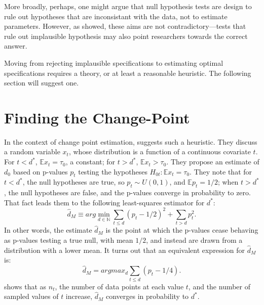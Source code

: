 \documentclass[12pt]{article}\usepackage[]{graphicx}\usepackage[]{color}
\newcommand{\dstar}{d^*}
\newcommand{\dhatm}{\hat{d}_M}
\newcommand{\EE}{\mathbb{E}}
\begin{document}
More broadly, perhaps, one might argue that null hypothesis tests are
design to rule out hypotheses that are inconsistant with the data, not
to estimate parameters.
However, as \citet{hodgeslehmann} showed, these aims are not
contradictory---tests that rule out implausible hypothesis may also
point researchers towards the correct answer.

Moving from rejecting implausible specifications to estimating optimal
specifications requires a theory, or at least a reasonable heuristic.
The following section will suggest one.

\section{Finding the Change-Point}\label{sec:change-point}
In the context of change point estimation, \citet{mallik} suggests
such a heuristic.
They discuss a random variable $x_t$, whose distribution is a function
of a continuous covariate $t$.
For $t<d^*$, $\EE x_t=\tau_0$, a constant; for $t>\dstar$, $\EE
x_t>\tau_0$.
They propose an estimate of $d_0$ based on p-values $p_t$
testing the hypotheses $H_{0t}:\EE x_t=\tau_0$.
They note that for $t<\dstar$, the null hypotheses are true, so
$p_t\sim U(0,1)$, and $\EE p_t =1/2$; when $t>\dstar$, the null hypotheses are false, and
the p-values converge in probability to zero.
That fact leads them to the following least-squares estimator for
$\dstar$:
\begin{equation*}
\dhatm\equiv arg\displaystyle\min_{d\in \mathbb{N}} \displaystyle\sum_{t\le d} (p_t -1/2)^2 +
\displaystyle\sum_{t>d} p_t^2.
\end{equation*}
In other words, the estimate $\dhatm$ is the point at which the
p-values cease behaving as p-values testing a true null, with mean
$1/2$, and instead are drawn from a distribution with a lower mean.
It turns out that an equivalent expression for $\dhatm$ is:
\begin{equation}\label{eq:mallikSimple}
\dhatm=argmax_d \displaystyle\sum_{t\le d} (p_t-1/4).
\end{equation}
\citet{mallik} shows that as $n_t$, the number of data points at each value
$t$, and the number of sampled values of $t$ increase, $\dhatm$
converges in probability to $\dstar$.
\end{document}
